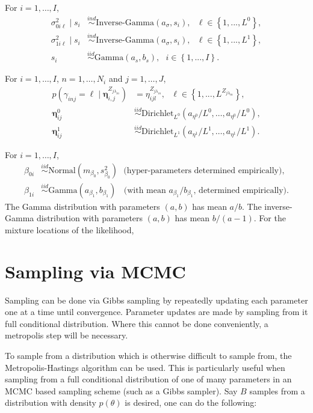 \documentclass[12pt]{article}
\newcommand{\bc}[1]{ \left\{#1\right\} }
\newcommand{\N}{ \mathcal{N} }
\newcommand{\iid}{\overset{iid}{\sim}}
\newcommand{\ind}{\overset{ind}{\sim}}
\def\N{\text{Normal}}
\def\G{\text{Gamma}}
\def\IG{\text{Inverse-Gamma}}
\def\Dir{\text{Dirichlet}}
\begin{document}
For $i=1, \ldots, I$,
%
\begin{align*}
\sigma^2_{0i\ell} \mid s_i &\ind \IG(a_\sigma, s_i), ~~~ \ell \in \bc{1,...,L^0}, \\
\sigma^2_{1i\ell} \mid s_i &\ind \IG(a_\sigma, s_i), ~~~ \ell \in \bc{1,...,L^1}, \\
s_i &\iid \G(a_s, b_s), ~~~ i \in \bc{1,...,I}.
\end{align*}

For $i=1, \ldots, I$, $n=1, \ldots, N_i$ and $j=1, \ldots, J$,
%
\begin{align*}
p(\gamma_{inj} = \ell \mid \bm\eta^{Z_{j \lambda_{in}}}_{i,j}) &= \eta^{Z_{j \lambda_{in}}}_{ijl},
~~~ \ell \in \bc{1,...,L^{Z_{j \lambda_{in}}}},  \\
\bm\eta^0_{ij} &\iid \Dir_{L^0}(a_{\eta^0}/L^0, \ldots, a_{\eta^0}/L^0), \\
\bm\eta^1_{ij} &\iid \Dir_{L^1}(a_{\eta^1}/L^1, \ldots, a_{\eta^1}/L^1). 
\end{align*}


For $i=1, \ldots, I$,
%
\begin{align*}
\beta_{0i} &\iid \N(m_{\beta_0}, s^2_{\beta_0}) ~~~
\text{(hyper-parameters determined empirically)}, \\
\beta_{1i} &\iid \G(a_{\beta_1}, b_{\beta_1}) ~~~~
\text{(with mean $a_{\beta_1}/b_{\beta_1}$, determined empirically)}. 
\end{align*}
%
The Gamma distribution with parameters $(a,b)$ has mean $a/b$. The
inverse-Gamma distribution with parameters $(a,b)$ has mean
$b / (a-1)$. For the mixture locations of the likelihood,
%


\section{Sampling via MCMC}\label{sampling-via-mcmc}

Sampling can be done via Gibbs sampling by repeatedly updating each
parameter one at a time until convergence. Parameter updates are made by
sampling from it full conditional distribution. Where this cannot be
done conveniently, a metropolis step will be necessary.

To sample from a distribution which is otherwise difficult to sample
from, the Metropolis-Hastings algorithm can be used. This is
particularly useful when sampling from a full conditional distribution
of one of many parameters in an MCMC based sampling scheme (such as a
Gibbs sampler). Say $B$ samples from a distribution with density
$p(\theta)$ is desired, one can do the following:
\end{document}
